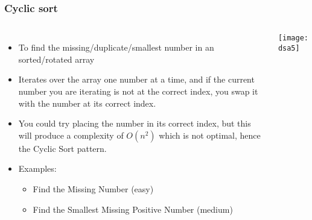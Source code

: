 \begin{frame}[fragile]
	\frametitle{Cyclic sort}
	\begin{columns}[T]
			\begin{itemize}
			\item To find the missing/duplicate/smallest number in an sorted/rotated array
				\item Iterates over the array one number at a time, and if the current number you are iterating is not at the correct index, you swap it with the number at its correct index. 
				\item You could try placing the number in its correct index, but this will produce a complexity of $O(n^2)$ which is not optimal, hence the Cyclic Sort pattern.
				\item Examples:
			\begin{itemize}
				\item Find the Missing Number (easy)
				\item Find the Smallest Missing Positive Number (medium)
			\end{itemize}

			\end{itemize}
			
		
\begin{center}
\texttt{[image: dsa5]}
\end{center}		
		\end{columns}		
\end{frame}

